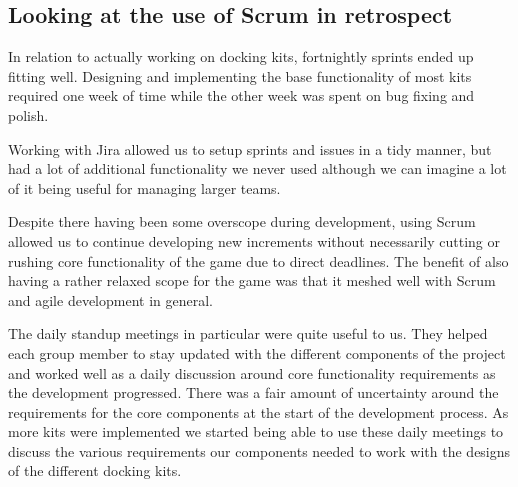 \subsection{Looking at the use of Scrum in retrospect}
In relation to actually working on docking kits, fortnightly sprints ended up fitting well. Designing and implementing the base functionality of most kits required one week of time while the other week was spent on bug fixing and polish. 

Working with Jira allowed us to setup sprints and issues in a tidy manner, but had a lot of additional functionality we never used although we can imagine a lot of it being useful for managing larger teams. 

Despite there having been some overscope during development, using Scrum allowed us to continue developing new increments without necessarily cutting or rushing core functionality of the game due to direct deadlines. The benefit of also having a rather relaxed scope for the game was that it meshed well with Scrum and agile development in general. 

The daily standup meetings in particular were quite useful to us. They helped each group member to stay updated with the different components of the project and worked well as a daily discussion around core functionality requirements as the development progressed. There was a fair amount of uncertainty around the requirements for the core components at the start of the development process. As more kits were implemented we started being able to use these daily meetings to discuss the various requirements our components needed to work with the designs of the different docking kits. 